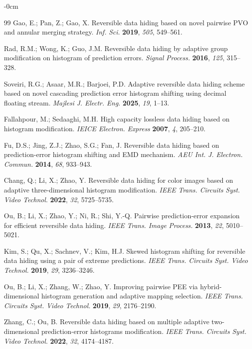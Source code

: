 \documentclass[journal,article,submit,pdftex,moreauthors]{Definitions/mdpi}
\begin{document}
\begin{adjustwidth}{-\extralength}{0cm}
\begin{thebibliography}{99}
Gao, E.; Pan, Z.; Gao, X.
Reversible data hiding based on novel pairwise PVO and annular merging strategy.
\emph{Inf. Sci.} \textbf{2019}, \emph{505}, 549--561.

Rad, R.M.; Wong, K.; Guo, J.M.
Reversible data hiding by adaptive group modification on histogram of prediction errors.
\emph{Signal Process.} \textbf{2016}, \emph{125}, 315--328.

Soveiri, R.G.; Asaar, M.R.; Barjoei, P.D.
Adaptive reversible data hiding scheme based on novel cascading prediction error histogram shifting using decimal floating stream.
\emph{Majlesi J. Electr. Eng.} \textbf{2025}, \emph{19}, 1--13.

Fallahpour, M.; Sedaaghi, M.H.
High capacity lossless data hiding based on histogram modification.
\emph{IEICE Electron. Express} \textbf{2007}, \emph{4}, 205--210.

Fu, D.S.; Jing, Z.J.; Zhao, S.G.; Fan, J.
Reversible data hiding based on prediction-error histogram shifting and EMD mechanism.
\emph{AEU Int. J. Electron. Commun.} \textbf{2014}, \emph{68}, 933--943.

Chang, Q.; Li, X.; Zhao, Y.
Reversible data hiding for color images based on adaptive three-dimensional histogram modification.
\emph{IEEE Trans. Circuits Syst. Video Technol.} \textbf{2022}, \emph{32}, 5725--5735.

Ou, B.; Li, X.; Zhao, Y.; Ni, R.; Shi, Y.-Q.
Pairwise prediction-error expansion for efficient reversible data hiding.
\emph{IEEE Trans. Image Process.} \textbf{2013}, \emph{22}, 5010--5021.

Kim, S.; Qu, X.; Sachnev, V.; Kim, H.J.
Skewed histogram shifting for reversible data hiding using a pair of extreme predictions.
\emph{IEEE Trans. Circuits Syst. Video Technol.} \textbf{2019}, \emph{29}, 3236--3246.

Ou, B.; Li, X.; Zhang, W.; Zhao, Y.
Improving pairwise PEE via hybrid-dimensional histogram generation and adaptive mapping selection.
\emph{IEEE Trans. Circuits Syst. Video Technol.} \textbf{2019}, \emph{29}, 2176--2190.

Zhang, C.; Ou, B.
Reversible data hiding based on multiple adaptive two-dimensional prediction-error histograms modification.
\emph{IEEE Trans. Circuits Syst. Video Technol.} \textbf{2022}, \emph{32}, 4174--4187.


\end{thebibliography}
\end{adjustwidth}
\end{document}
